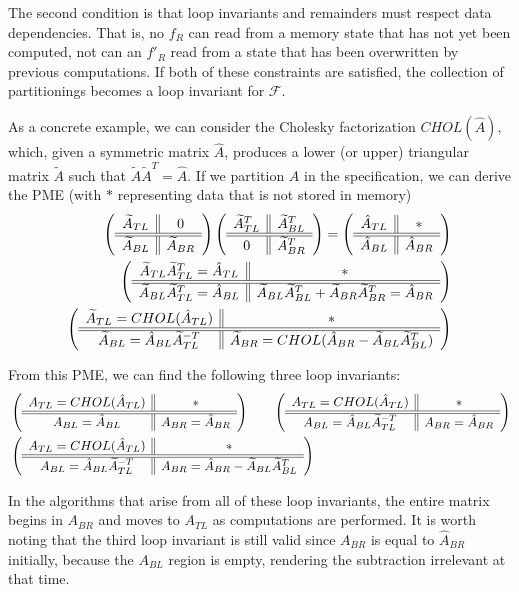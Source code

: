 \documentclass[12pt,letterpaper]{article}
\newcommand*{\opF}{\mathcal{F}}
\newcommand*{\opf}{f}
\begin{document}
The second condition is that loop invariants and remainders must respect data dependencies.
That is, no $\opf_R$ can read from a memory state that has not yet been computed, not can an $\opf'_R$ read from a state that has been overwritten by previous computations.
If both of these constraints are satisfied, the collection of partitionings becomes a loop invariant for $\opF$.

As a concrete example, we can consider the Cholesky factorization $CHOL(\hat{A})$, which, given a symmetric matrix $\hat{A}$, produces a lower (or upper) triangular matrix $\widetilde{A}$ such that $\widetilde{A}\widetilde{A}^T = \hat{A}$.
If we partition $A$ in the specification, we can derive the PME (with $*$ representing data that is not stored in memory)
\begin{align*}
  \left( \begin{array}{c || c} \widetilde{A}_{TL} & 0 \\ \hline \hline \widetilde{A}_{BL} & \widetilde{A}_{BR} \end{array} \right)
  \left( \begin{array}{c || c} \widetilde{A}_{TL}^T & \widetilde{A}_{BL}^T \\ \hline \hline 0 & \widetilde{A}_{BR}^T \end{array} \right)
  = \left( \begin{array}{c || c} \hat{A}_{TL} & * \\ \hline \hline \hat{A}_{BL} & \hat{A}_{BR} \end{array} \right)\\
  \left( \begin{array}{c || c} \widetilde{A}_{TL}\widetilde{A}_{TL}^T = \hat{A}_{TL} & * \\ \hline \hline \widetilde{A}_{BL}\widetilde{A}_{TL}^T = \hat{A}_{BL} & \widetilde{A}_{BL}\widetilde{A}_{BL}^T + \widetilde{A}_{BR}\widetilde{A}_{BR}^T = \hat{A}_{BR} \end{array} \right)\\
  \left( \begin{array}{c || c} \widetilde{A}_{TL} = CHOL(\hat{A}_{TL}) & * \\ \hline \hline \widetilde{A}_{BL} = \hat{A}_{BL}\widetilde{A}_{TL}^{-T} & \widetilde{A}_{BR} = CHOL(\hat{A}_{BR} - \widetilde{A}_{BL}\widetilde{A}_{BL}^T) \end{array} \right)
\end{align*}

From this PME, we can find the following three loop invariants:
\begin{align*}
  &\left( \begin{array}{c || c} A_{TL} = CHOL(\hat{A}_{TL}) & * \\ \hline \hline A_{BL} = \hat{A}_{BL} & A_{BR} = \hat{A}_{BR} \end{array} \right) \qquad
  \left( \begin{array}{c || c} A_{TL} = CHOL(\hat{A}_{TL}) & * \\ \hline \hline A_{BL} = \hat{A}_{BL}\widetilde{A}_{TL}^{-T} & A_{BR} = \hat{A}_{BR} \end{array} \right)\\
  &\left( \begin{array}{c || c} A_{TL} = CHOL(\hat{A}_{TL}) & * \\ \hline \hline A_{BL} = \hat{A}_{BL}\widetilde{A}_{TL}^{-T} & A_{BR} = \hat{A}_{BR} - \widetilde{A}_{BL}\widetilde{A}_{BL}^T \end{array} \right)
\end{align*}

In the algorithms that arise from all of these loop invariants, the entire matrix begins in $A_{BR}$ and moves to $A_{TL}$ as computations are performed.
It is worth noting that the third loop invariant is still valid since $A_{BR}$ is equal to $\hat{A}_{BR}$ initially, because the $A_{BL}$ region is empty, rendering the subtraction irrelevant at that time.
\end{document}
